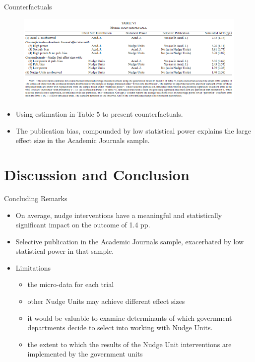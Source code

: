 \documentclass[dvipdfmx,11pt]{beamer}
\begin{document}
\begin{frame}{Counterfactuals}
  \begin{figure}
    \centering
    \includegraphics[scale = .65]{fig_tab/os20220412/T6.png}
  \end{figure}
  \begin{itemize}
    \item Using estimation in Table 5 to present counterfactuals.
    \item The publication bias, compounded by low statistical power explains the large effect size in the Academic Journals sample.
  \end{itemize}
\end{frame}

\section{Discussion and Conclusion}
\frame{\sectionpage}

\begin{frame}{Concluding Remarks}
  \begin{itemize}
    \item On average, nudge interventions have a meaningful and statistically significant impact on the outcome of 1.4 pp.
    \item Selective publication in the Academic Journals sample, exacerbated by low statistical power in that sample.
    \item Limitations 
    \begin{itemize}
      \item the micro-data for each trial
      \item other Nudge Units may achieve different effect sizes
      \item it would be valuable to examine determinants of which government departments decide to select into working with Nudge Units.
      \item the extent to which the results of the Nudge Unit interventions are implemented by the government units
    \end{itemize}
  \end{itemize}
\end{frame}
\end{document}
